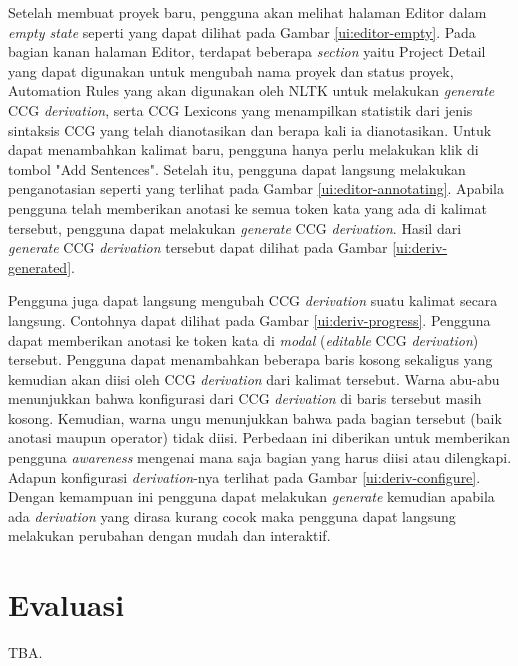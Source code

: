 Setelah membuat proyek baru, pengguna akan melihat halaman Editor dalam
\textit{empty state} seperti yang dapat dilihat pada Gambar \ref{ui:editor-empty}.
Pada bagian kanan halaman Editor, terdapat beberapa \textit{section} yaitu
Project Detail yang dapat digunakan untuk mengubah nama proyek dan status proyek,
Automation Rules yang akan digunakan oleh NLTK untuk melakukan \textit{generate}
CCG \textit{derivation}, serta CCG Lexicons yang menampilkan statistik dari jenis
sintaksis CCG yang telah dianotasikan dan berapa kali ia dianotasikan.
Untuk dapat menambahkan kalimat baru, pengguna hanya perlu melakukan klik di
tombol "Add Sentences". Setelah itu, pengguna dapat langsung melakukan penganotasian
seperti yang terlihat pada Gambar \ref{ui:editor-annotating}. Apabila pengguna telah
memberikan anotasi ke semua token kata yang ada di kalimat tersebut, pengguna dapat
melakukan \textit{generate} CCG \textit{derivation}. Hasil dari \textit{generate} CCG
\textit{derivation} tersebut dapat dilihat pada Gambar \ref{ui:deriv-generated}.

Pengguna juga dapat langsung mengubah CCG \textit{derivation} suatu kalimat secara
langsung. Contohnya dapat dilihat pada Gambar \ref{ui:deriv-progress}.
Pengguna dapat memberikan anotasi ke token kata di \textit{modal} (\textit{editable}
CCG \textit{derivation}) tersebut. Pengguna dapat menambahkan beberapa baris kosong
sekaligus yang kemudian akan diisi oleh CCG \textit{derivation} dari kalimat tersebut.
Warna abu-abu menunjukkan bahwa konfigurasi dari CCG \textit{derivation} di baris tersebut
masih kosong. Kemudian, warna ungu menunjukkan bahwa pada bagian tersebut (baik anotasi
maupun operator) tidak diisi. Perbedaan ini diberikan untuk memberikan pengguna
\textit{awareness} mengenai mana saja bagian yang harus diisi atau dilengkapi.
Adapun konfigurasi \textit{derivation}-nya terlihat pada Gambar \ref{ui:deriv-configure}.
Dengan kemampuan ini pengguna dapat melakukan \textit{generate} kemudian apabila ada
\textit{derivation} yang dirasa kurang cocok maka pengguna dapat langsung melakukan
perubahan dengan mudah dan interaktif.



\section{Evaluasi}

TBA.

